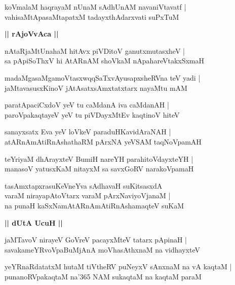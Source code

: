\documentclass[twoside,12pt,openright]{book}
\newcounter{shloka}[chapter]
\def\uvaca#1{\centerline{{\large\textbf{#1}}}}
\begin{document}
\begin{shloka}%
koVmalaM haqrayaM nUnaM sAdhUnAM navaniVtavatf |\\
vahisaMtApasaMtapatxM tadayxthAdarxvati suPxTuM 
\end{shloka}

\uvaca{|| rAjoVvAca ||}

\begin{shloka}%
nAtaRjaMtUnahaM hitAvx piVDitoV ganutxmutasxheV |\\
sa pApiSoThxV hi AtARnAM shoVkaM nApahareVtakxSxmaH 
\end{shloka}

\begin{shloka}%
madaMgasaMgamoVtasxwqqSaTxvAyusapxsheRVna teV yadi |\\
jaMtavasusxKinoV jAtAsatxsAmxtatxtarx nayaMtu mAM 
\end{shloka}

\begin{shloka}%
paratApaciCxdoV yeV tu caMdanA iva caMdanAH |\\
paroVpakaqtayeV yeV tu piVDayxMtEv kaqtinoV hiteV 
\end{shloka}

\begin{shloka}%
sanayxsatx Eva yeV loVkeV paraduHKavidAraNAH |\\
atARnAmAtiRnAshathaRM pArxNA yeVSAM taqNoVpamAH 
\end{shloka}

\begin{shloka}%
teYriyaM dhArayxteV BumiH nareYH parahitoVdayxteYH |\\
manasoV yatusxKaM nitayxM sa savxGoRV narakoVpamaH 
\end{shloka}

\begin{shloka}%
tasAmxtapxrasuKeVneYva sAdhavaH suKitsasxdA \\
varaM nirayapAtoVtarx varaM pArxNaviyoVjanaM |\\
na punaH kaSxNamAtARnAmAtiRnAshamaqteV suKaM 
\end{shloka}

\uvaca{|| dUtA UcuH ||}

\begin{shloka}%
jaMTavoV nirayeV GoVreV pacayxMteV tatarx pApinaH |\\
savakameYRvoVpaBuMjAnA moVhasAthxnaM na vidhayxteV
\end{shloka}

\begin{shloka}%
yeYRnaRdatatxM hutaM tiVtheRV puNeyxV sAnxnaM na vA kaqtaM |\\
punanoRVpakaqtaM na\char'365 NAM sukaqtaM na kaqtaM paraM 
\end{shloka}
\end{document}
